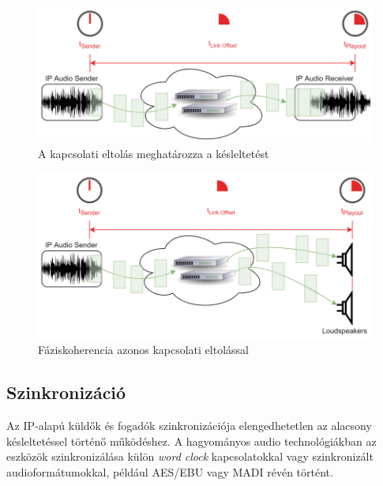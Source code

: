 \begin{figure}[H]
	\centering
	\includegraphics[width=\linewidth, keepaspectratio]{figures/link_offset_latency.png}
	\caption{A kapcsolati eltolás meghatározza a késleltetést \cite{AHNERT2023}}
	\label {fig:link_offset_latency}
\end{figure}
\begin{figure}[H]
	\centering
	\includegraphics[width=\linewidth, keepaspectratio]{figures/phase_coherence_link_offset.png}
	\caption{Fáziskoherencia azonos kapcsolati eltolással \cite{AHNERT2023}}
	\label {fig:phase_coherence_link_offset}
\end{figure}
\subsection{Szinkronizáció}
Az IP-alapú küldők és fogadók szinkronizációja elengedhetetlen az alacsony késleltetéssel történő működéshez. 
A hagyományos audio technológiákban az eszközök szinkronizálása külön \textit{word clock} kapcsolatokkal 
vagy szinkronizált audioformátumokkal, például AES/EBU vagy MADI révén történt.

